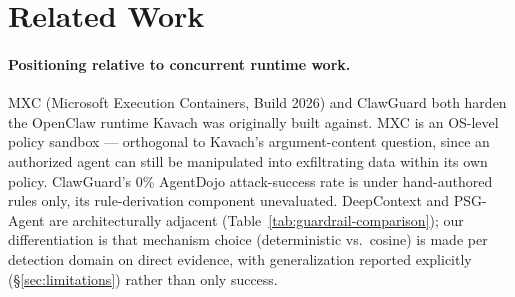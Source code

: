\documentclass[sigconf,anonymous,review]{acmart}
\begin{document}
\newcommand{\inputtable}[1]{\IfFileExists{#1.tex}{}{%
  \begin{center}\fbox{\textcolor{red}{[table #1 — run make\_section5.py]}}\end{center}}}






\section{Related Work}
\label{sec:related}

\paragraph{Positioning relative to concurrent runtime work.} MXC (Microsoft
Execution Containers, Build 2026) and ClawGuard \cite{clawguard2026} both
harden the OpenClaw runtime Kavach was originally built against. MXC is an
OS-level policy sandbox --- orthogonal to Kavach's argument-content
question, since an authorized agent can still be manipulated into
exfiltrating data within its own policy. ClawGuard's 0\% AgentDojo
attack-success rate is under hand-authored rules only, its rule-derivation
component unevaluated. DeepContext \cite{albrethsen2026deepcontext} and
PSG-Agent \cite{psgagent2026} are architecturally adjacent
(Table~\ref{tab:guardrail-comparison}); our differentiation is that
mechanism choice (deterministic vs.\ cosine) is made per detection domain
on direct evidence, with generalization reported explicitly
(\S\ref{sec:limitations}) rather than only success.
\end{document}
